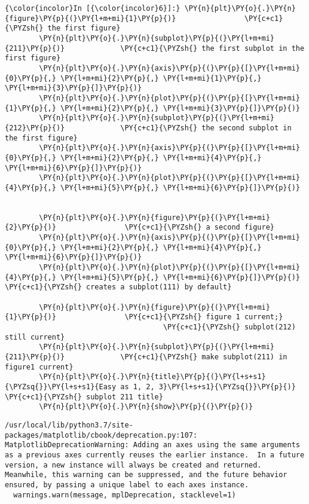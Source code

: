    \begin{Verbatim}[commandchars=\\\{\}]
{\color{incolor}In [{\color{incolor}6}]:} \PY{n}{plt}\PY{o}{.}\PY{n}{figure}\PY{p}{(}\PY{l+m+mi}{1}\PY{p}{)}                \PY{c+c1}{\PYZsh{} the first figure}
        \PY{n}{plt}\PY{o}{.}\PY{n}{subplot}\PY{p}{(}\PY{l+m+mi}{211}\PY{p}{)}             \PY{c+c1}{\PYZsh{} the first subplot in the first figure}
        \PY{n}{plt}\PY{o}{.}\PY{n}{axis}\PY{p}{(}\PY{p}{[}\PY{l+m+mi}{0}\PY{p}{,} \PY{l+m+mi}{2}\PY{p}{,} \PY{l+m+mi}{1}\PY{p}{,} \PY{l+m+mi}{3}\PY{p}{]}\PY{p}{)}
        \PY{n}{plt}\PY{o}{.}\PY{n}{plot}\PY{p}{(}\PY{p}{[}\PY{l+m+mi}{1}\PY{p}{,} \PY{l+m+mi}{2}\PY{p}{,} \PY{l+m+mi}{3}\PY{p}{]}\PY{p}{)}
        \PY{n}{plt}\PY{o}{.}\PY{n}{subplot}\PY{p}{(}\PY{l+m+mi}{212}\PY{p}{)}             \PY{c+c1}{\PYZsh{} the second subplot in the first figure}
        \PY{n}{plt}\PY{o}{.}\PY{n}{axis}\PY{p}{(}\PY{p}{[}\PY{l+m+mi}{0}\PY{p}{,} \PY{l+m+mi}{2}\PY{p}{,} \PY{l+m+mi}{4}\PY{p}{,} \PY{l+m+mi}{6}\PY{p}{]}\PY{p}{)}
        \PY{n}{plt}\PY{o}{.}\PY{n}{plot}\PY{p}{(}\PY{p}{[}\PY{l+m+mi}{4}\PY{p}{,} \PY{l+m+mi}{5}\PY{p}{,} \PY{l+m+mi}{6}\PY{p}{]}\PY{p}{)}
        
        
        \PY{n}{plt}\PY{o}{.}\PY{n}{figure}\PY{p}{(}\PY{l+m+mi}{2}\PY{p}{)}                \PY{c+c1}{\PYZsh{} a second figure}
        \PY{n}{plt}\PY{o}{.}\PY{n}{axis}\PY{p}{(}\PY{p}{[}\PY{l+m+mi}{0}\PY{p}{,} \PY{l+m+mi}{2}\PY{p}{,} \PY{l+m+mi}{4}\PY{p}{,} \PY{l+m+mi}{6}\PY{p}{]}\PY{p}{)}
        \PY{n}{plt}\PY{o}{.}\PY{n}{plot}\PY{p}{(}\PY{p}{[}\PY{l+m+mi}{4}\PY{p}{,} \PY{l+m+mi}{5}\PY{p}{,} \PY{l+m+mi}{6}\PY{p}{]}\PY{p}{)}          \PY{c+c1}{\PYZsh{} creates a subplot(111) by default}
        
        \PY{n}{plt}\PY{o}{.}\PY{n}{figure}\PY{p}{(}\PY{l+m+mi}{1}\PY{p}{)}                \PY{c+c1}{\PYZsh{} figure 1 current;}
                                     \PY{c+c1}{\PYZsh{} subplot(212) still current}
        \PY{n}{plt}\PY{o}{.}\PY{n}{subplot}\PY{p}{(}\PY{l+m+mi}{211}\PY{p}{)}             \PY{c+c1}{\PYZsh{} make subplot(211) in figure1 current}
        \PY{n}{plt}\PY{o}{.}\PY{n}{title}\PY{p}{(}\PY{l+s+s1}{\PYZsq{}}\PY{l+s+s1}{Easy as 1, 2, 3}\PY{l+s+s1}{\PYZsq{}}\PY{p}{)} \PY{c+c1}{\PYZsh{} subplot 211 title}
        \PY{n}{plt}\PY{o}{.}\PY{n}{show}\PY{p}{(}\PY{p}{)}
\end{Verbatim}


    \begin{Verbatim}[commandchars=\\\{\}]
/usr/local/lib/python3.7/site-packages/matplotlib/cbook/deprecation.py:107: MatplotlibDeprecationWarning: Adding an axes using the same arguments as a previous axes currently reuses the earlier instance.  In a future version, a new instance will always be created and returned.  Meanwhile, this warning can be suppressed, and the future behavior ensured, by passing a unique label to each axes instance.
  warnings.warn(message, mplDeprecation, stacklevel=1)

    \end{Verbatim}


